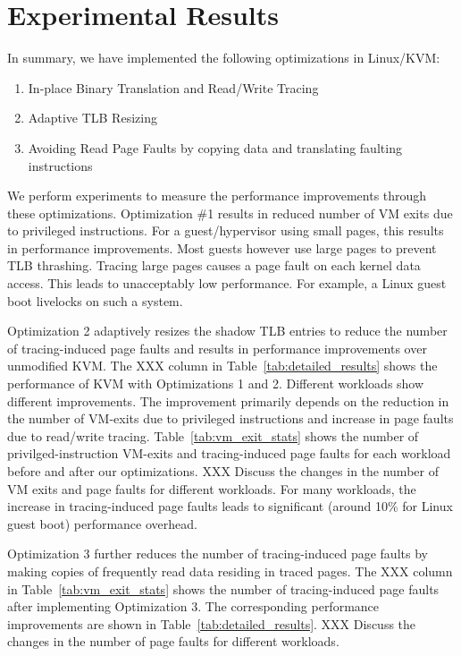 \documentclass[10pt,twocolumn]{article}
\begin{document}
\section{Experimental Results}
\label{sec:results}
In summary, we have implemented the following optimizations in Linux/KVM:
\begin{enumerate}
  \item In-place Binary Translation and Read/Write Tracing
  \item Adaptive TLB Resizing
  \item Avoiding Read Page Faults by copying data and translating faulting instructions
\end{enumerate}
We perform experiments to measure the performance improvements through these
optimizations. Optimization \#1 results in reduced number of VM exits due
to privileged instructions. For a guest/hypervisor using small pages, this results
in performance improvements. Most guests however use large pages to prevent
TLB thrashing. Tracing large pages causes a page fault on each kernel data access.
This leads to unacceptably low performance. For example, a Linux guest boot livelocks
on such a system.

Optimization 2 adaptively resizes the shadow TLB entries to reduce
the number of tracing-induced page faults and results in
performance improvements over unmodified KVM. The XXX column
in Table~\ref{tab:detailed_results} shows the performance of KVM with Optimizations
1 and 2.
Different workloads show different improvements. The improvement primarily depends
on the reduction in the number of VM-exits due to privileged instructions and
increase in page faults due to read/write tracing.
Table~\ref{tab:vm_exit_stats} shows the number of
privilged-instruction VM-exits and tracing-induced page faults for each workload
before and after our optimizations. XXX Discuss the changes in the number
of VM exits and page faults for different workloads.
For many workloads, the increase in tracing-induced page faults leads
to significant (around 10\% for Linux guest boot) performance overhead.

Optimization 3 further reduces the number of tracing-induced page faults by
making copies of frequently read data residing in traced pages. The XXX column in
Table~\ref{tab:vm_exit_stats} shows the number of tracing-induced page faults
after implementing Optimization 3. The corresponding performance improvements
are shown in Table~\ref{tab:detailed_results}. XXX Discuss the changes in the number
of page faults for different workloads.
\end{document}
